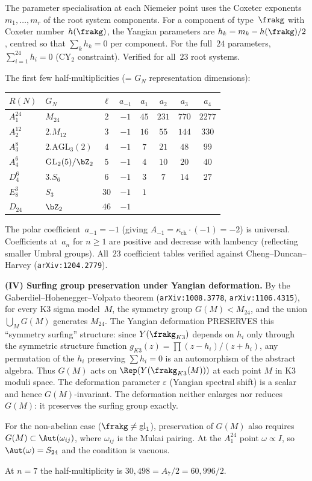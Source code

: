 \begin{conjecture}
The parameter specialisation at each Niemeier point uses the Coxeter
exponents~$m_1, \ldots, m_r$ of the root system components. For a
component of type~$\frakg$ with Coxeter number~$h(\frakg)$, the
Yangian parameters are $h_k = m_k - h(\frakg)/2$, centred so that
$\sum_k h_k = 0$ per component. For the full~$24$ parameters,
$\sum_{i=1}^{24} h_i = 0$ (CY$_2$ constraint). Verified for all~$23$
root systems.

The first few half-multiplicities (= $G_N$ representation dimensions):
\begin{center}
\small
\renewcommand{\arraystretch}{1.15}
\begin{tabular}{llcccccc}
$R(N)$ & $G_N$ & $\ell$ & $a_{-1}$ & $a_1$ & $a_2$ & $a_3$ & $a_4$ \\
\hline
$A_1^{24}$ & $M_{24}$ & $2$ & $-1$ & $45$ & $231$ & $770$ & $2277$ \\
$A_2^{12}$ & $2.M_{12}$ & $3$ & $-1$ & $16$ & $55$ & $144$ & $330$ \\
$A_3^{8}$ & $2.\mathrm{AGL}_3(2)$ & $4$ & $-1$ & $7$ & $21$ & $48$ & $99$ \\
$A_4^{6}$ & $\mathrm{GL}_2(5)/\bZ_2$ & $5$ & $-1$ & $4$ & $10$ & $20$ & $40$ \\
$D_4^{6}$ & $3.S_6$ & $6$ & $-1$ & $3$ & $7$ & $14$ & $27$ \\
$E_8^{3}$ & $S_3$ & $30$ & $-1$ & $1$ & & & \\
$D_{24}$ & $\bZ_2$ & $46$ & $-1$ & & & &
\end{tabular}
\end{center}
The polar coefficient~$a_{-1} = -1$ (giving $A_{-1} = \kappa_{\mathrm{ch}}
\cdot (-1) = -2$) is universal. Coefficients at~$a_n$ for $n \geq 1$
are positive and decrease with lambency (reflecting smaller Umbral groups).
All~$23$ coefficient tables verified against
Cheng--Duncan--Harvey (\texttt{arXiv:1204.2779}).

\medskip\noindent
\textbf{(IV) Surfing group preservation under Yangian deformation.}
By the Gaberdiel--Hohenegger--Volpato theorem
(\texttt{arXiv:1008.3778}, \texttt{arXiv:1106.4315}), for every K3
sigma model~$M$, the symmetry group $G(M) < M_{24}$, and the union
$\bigcup_M G(M)$ generates $M_{24}$. The Yangian deformation
PRESERVES this ``symmetry surfing'' structure: since $Y(\frakg_{K3})$
depends on $h_i$ only through the symmetric structure function
$g_{K3}(z) = \prod (z - h_i)/(z + h_i)$, any permutation of the
$h_i$ preserving $\sum h_i = 0$ is an automorphism of the abstract
algebra. Thus $G(M)$ acts on $\Rep(Y(\frakg_{K3}(M)))$ at each point
$M$ in K3 moduli space. The deformation parameter $\varepsilon$
(Yangian spectral shift) is a scalar and hence
$G(M)$-invariant. The deformation neither enlarges nor reduces
$G(M)$: it preserves the surfing group exactly.

For the non-abelian case ($\frakg \neq \mathrm{gl}_1$), preservation
of $G(M)$ also requires $G(M) \subset \Aut(\omega_{ij})$,
where $\omega_{ij}$ is the Mukai pairing. At the $A_1^{24}$ point
$\omega \propto I$, so $\Aut(\omega) = S_{24}$ and the condition
is vacuous.
\end{conjecture}
At $n = 7$ the half-multiplicity is
$30{,}498 = A_7/2 = 60{,}996/2$.

